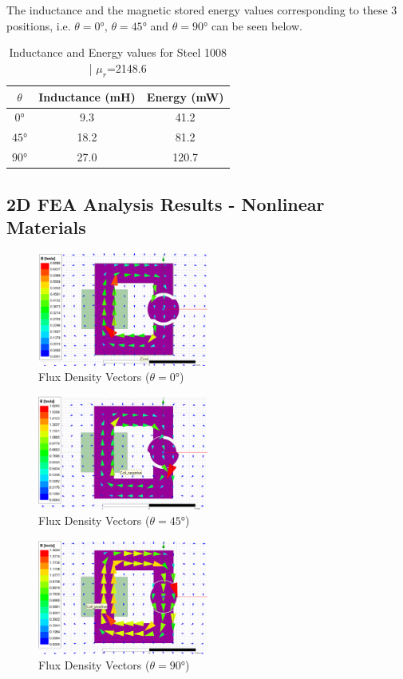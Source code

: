 \documentclass[a4paper, 11pt]{article}
\begin{document}
The inductance and the magnetic stored energy values corresponding to these 3 positions, i.e. $\theta=\ang{0}$, $\theta=\ang{45}$ and $\theta=\ang{90}$ can be seen below.

\begin{table}[htbp]
	\begin{center}
		\begin{tabular}{|c|c|c}
		$\theta$ & Inductance (mH) & Energy (mW)\\
		\hline
		$\ang{0}$ & 9.3 & 41.2\\
		$\ang{45}$ & 18.2 & 81.2\\
		$\ang{90}$ & 27.0 & 120.7\\
		\end{tabular}
	\end{center}
	\caption{Inductance and Energy values for Steel 1008 | $\mu_r$=2148.6}
\end{table}
\subsection{2D FEA Analysis Results - Nonlinear Materials}

\begin{figure}[h!]
\centering
\includegraphics[width=0.5\textwidth]{Q2b-0.png}
\caption{Flux Density Vectors ($\theta=\ang{0}$)}
\end{figure}
\begin{figure}[h!]
\centering
\includegraphics[width=0.5\textwidth]{Q2b-45.png}
\caption{Flux Density Vectors ($\theta=\ang{45}$)}
\end{figure}
\begin{figure}[h!]
\centering
\includegraphics[width=0.5\textwidth]{Q2b-90.png}
\caption{Flux Density Vectors ($\theta=\ang{90}$)}
\end{figure}
\end{document}
